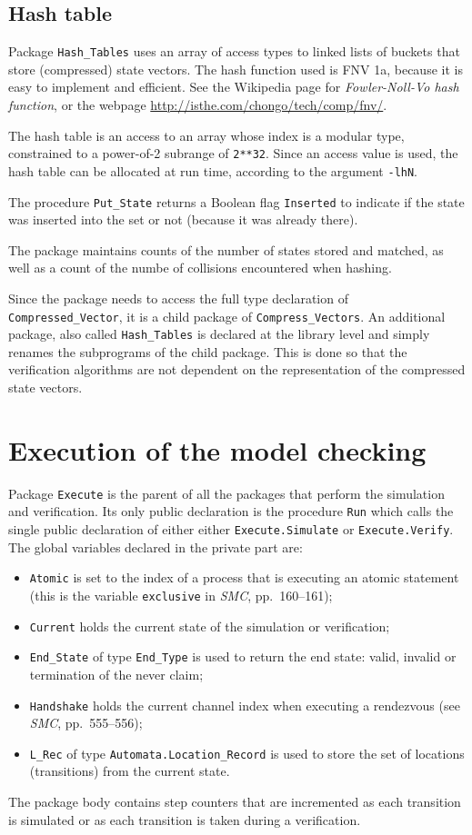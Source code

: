 \documentclass[11pt]{article}
\newcommand*{\smc}{\textit{SMC}}
\newcommand*{\p}[1]{\texttt{#1}}
\begin{document}
\subsection{Hash table}

Package \p{Hash\_Tables} uses an array of access types to linked lists
of buckets that store (compressed) state vectors. The hash function used
is FNV 1a, because it is easy to implement and efficient. See the
Wikipedia page for \emph{Fowler-Noll-Vo hash function}, or the
webpage \url{http://isthe.com/chongo/tech/comp/fnv/}.

The hash table is an access to an array whose index is a modular type,
constrained to a power-of-2 subrange of \p{2**32}. Since an access value
is used, the hash table can be allocated at run time, according to the
argument \p{-lhN}.

The procedure \p{Put\_State} returns a Boolean flag \p{Inserted} to
indicate if the state was inserted into the set or not (because it was
already there).

The package maintains counts of the number of states stored and matched,
as well as a count of the numbe of collisions encountered when hashing.

Since the package needs to access the full type declaration of
\p{Compressed\_Vector}, it is a child package of \p{Compress\_Vectors}.
An additional package, also called \p{Hash\_Tables} is declared at the
library level and simply renames the subprograms of the child package.
This is done so that the verification algorithms are not dependent on
the representation of the compressed state vectors.

\section{Execution of the model checking}

Package \p{Execute} is the parent of all the packages that perform the
simulation and verification. Its only public declaration is the
procedure \p{Run} which calls the single public declaration of either
either \p{Execute.Simulate} or \p{Execute.Verify}.
The global variables declared in the private part are:
\begin{itemize}
\item \p{Atomic} is set to the index of a process that is
executing an atomic statement (this is the variable \p{exclusive} in
\smc{}, pp.~160--161);
\item \p{Current} holds the current state of the simulation or
verification;
\item \p{End\_State} of type \p{End\_Type} is used to return the end state:
valid, invalid or termination of the never claim;
\item \p{Handshake} holds the current channel index when executing a
rendezvous (see \smc{}, pp.~555--556);
\item \p{L\_Rec} of type \p{Automata.Location\_Record} is used
to store the set of locations (transitions) from the current state.
\end{itemize}
The package body contains step counters that are incremented as each
transition is simulated or as each transition is taken during a
verification.
\end{document}
